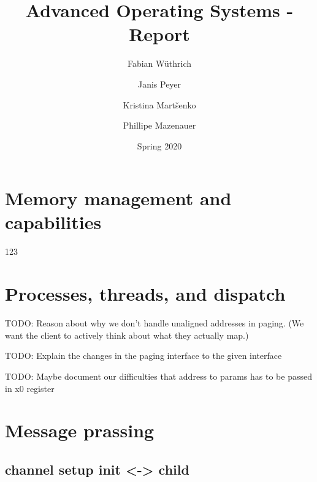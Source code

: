 \documentclass[11pt,a4paper]{report}
\begin{document}
\title{Advanced Operating Systems - Report}
\author{
Fabian Wüthrich
\and
Janis Peyer 
\and
Kristina Martšenko
\and
Phillipe Mazenauer
}
\date{Spring 2020}

\maketitle

\tableofcontents

\listoffigures

\listoftables

\clearpage

\chapter{Memory management and capabilities}

123 \cite{aos-book}

\chapter{Processes, threads, and dispatch}

TODO: Reason about why we don't handle unaligned addresses in paging. (We want the client to actively think about what they actually map.)

TODO: Explain the changes in the paging interface to the given interface

TODO: Maybe document our difficulties that address to params has to be passed in x0 register

\chapter{Message prassing}

\section{channel setup init <-> child}
\end{document}
